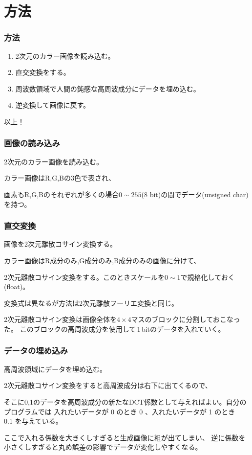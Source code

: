 \documentclass[dvipdfmx,11pt,notheorems]{beamer}
\theoremstyle{definition}
\begin{document}
\section{方法}
\begin{frame}\frametitle{方法}
	\begin{enumerate}
		\item 2次元のカラー画像を読み込む。
		\item 直交変換をする。
		\item 周波数領域で人間の鈍感な高周波成分にデータを埋め込む。
		\item 逆変換して画像に戻す。
	\end{enumerate}
	以上！
\end{frame}

\begin{frame}\frametitle{画像の読み込み}
	\begin{block}{}
		2次元のカラー画像を読み込む。
	\end{block}
	カラー画像はR,G,Bの3色で表され、

	画素もR,G,Bのそれぞれが多くの場合$0\sim 255$(8 bit)の間でデータ(unsigned char)を持つ。
\end{frame}

\begin{frame}\frametitle{直交変換}
	\begin{block}{}
		画像を2次元離散コサイン変換する。
	\end{block}
	カラー画像はR成分のみ,G成分のみ,B成分のみの画像に分けて、

	2次元離散コサイン変換をする。このときスケールを$0\sim 1$で規格化しておく(float)。

	変換式は異なるが方法は2次元離散フーリエ変換と同じ。

	2次元離散コサイン変換は画像全体を$4\times 4$マスのブロックに分割しておこなった。
	このブロックの高周波成分を使用して\,1\,bitのデータを入れていく。
\end{frame}

\begin{frame}\frametitle{データの埋め込み}
	\begin{block}{}
		高周波領域にデータを埋め込む。
	\end{block}
	2次元離散コサイン変換をすると高周波成分は右下に出てくるので、

	そこに0,1のデータを高周波成分の新たなDCT係数として与えればよい。自分のプログラムでは
	入れたいデータが 0 のとき 0 、入れたいデータが 1 のとき　0.1 を与えている。

	ここで入れる係数を大きくしすぎると生成画像に粗が出てしまい、
	逆に係数を小さくしすぎると丸め誤差の影響でデータが変化しやすくなる。
\end{frame}
\end{document}
